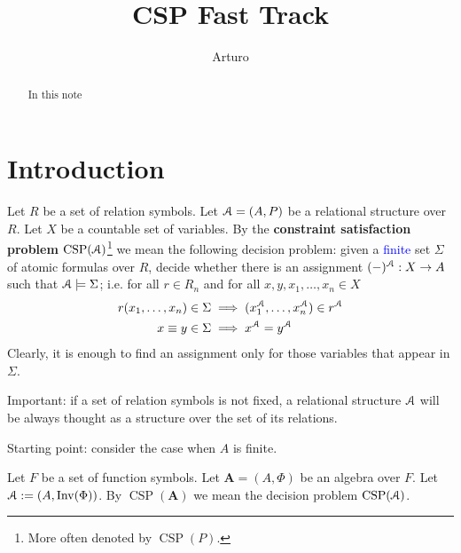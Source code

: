 \documentclass{amsart}
\theoremstyle{plain}
\theoremstyle{definition}
\theoremstyle{remark}
\DeclareMathOperator{\CSP}{CSP}
\DeclareMathOperator{\Inv}{Inv}
\begin{document}
\title{CSP Fast Track}
\author{Arturo}


\begin{abstract}
   In this note 
\end{abstract}

\maketitle

\section{Introduction}
Let $R$ be a set of relation symbols. 
Let $\EuScript{A}=(A, P)$ be a relational structure over $R$.
Let $X$ be a countable set of variables. 
By the \textbf{constraint satisfaction problem} $\CSP(\EuScript{A})$\footnote{More often denoted by $\CSP(P)$.} we mean the following decision problem: 
given a \textcolor{blue}{finite} set $\Sigma$ of atomic formulas over $R$, decide whether there is 
an assignment $(-)^{\EuScript{A}} : X \to A$ such that 
$\EuScript{A} \models \Sigma$; 
i.e. for all $r \in R_n$ and for all $x,y,x_1, \ldots, x_n \in X$ 
\begin{align}
    r(x_1, \ldots, x_n) \in \Sigma & \implies  (x_1^{{\EuScript{A}}}, \ldots, x_n^{{\EuScript{A}}}) \in r^{\EuScript{A}} \\
    x \equiv y \in \Sigma & \implies x^{{\EuScript{A}}} = y^{{\EuScript{A}}}
\end{align}
Clearly, it is enough to find an assignment only for those variables that appear in $\Sigma$. 

Important: if a set of relation symbols is not fixed, a relational structure $\EuScript{A}$ will be always thought as a structure over the set of its relations. 

Starting point: consider the case when $A$ is finite. 


Let $F$ be a set of function symbols. 
Let $\mathbf{A}=(A, \Phi)$ be an algebra over $F$. 
Let $\EuScript{A}:=(A, \Inv(\Phi))$. 
By $\CSP(\mathbf{A})$ we mean the decision problem $\CSP(\EuScript{A})$. 
\end{document}
